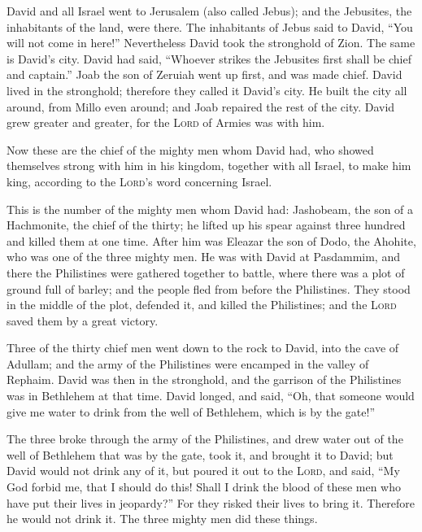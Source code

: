  David and all Israel went to Jerusalem (also called
Jebus); and the Jebusites, the inhabitants of the land, were there.
 The inhabitants of Jebus said to David, ``You will not
come in here!'' Nevertheless David took the stronghold of Zion. The same
is David's city.  David had said, ``Whoever strikes the
Jebusites first shall be chief and captain.'' Joab the son of Zeruiah
went up first, and was made chief.  David lived in the
stronghold; therefore they called it David's city.  He
built the city all around, from Millo even around; and Joab repaired the
rest of the city.  David grew greater and greater, for the
\textsc{Lord} of Armies was with him.

 Now these are the chief of the mighty men whom David
had, who showed themselves strong with him in his kingdom, together with
all Israel, to make him king, according to the \textsc{Lord}'s word
concerning Israel.

 This is the number of the mighty men whom David had:
Jashobeam, the son of a Hachmonite, the chief of the thirty; he lifted
up his spear against three hundred and killed them at one time.
 After him was Eleazar the son of Dodo, the Ahohite, who
was one of the three mighty men.  He was with David at
Pasdammim, and there the Philistines were gathered together to battle,
where there was a plot of ground full of barley; and the people fled
from before the Philistines.  They stood in the middle of
the plot, defended it, and killed the Philistines; and the \textsc{Lord}
saved them by a great victory.

 Three of the thirty chief men went down to the rock to
David, into the cave of Adullam; and the army of the Philistines were
encamped in the valley of Rephaim.  David was then in the
stronghold, and the garrison of the Philistines was in Bethlehem at that
time.  David longed, and said, ``Oh, that someone would
give me water to drink from the well of Bethlehem, which is by the
gate!''

 The three broke through the army of the Philistines, and
drew water out of the well of Bethlehem that was by the gate, took it,
and brought it to David; but David would not drink any of it, but poured
it out to the \textsc{Lord},  and said, ``My God forbid
me, that I should do this! Shall I drink the blood of these men who have
put their lives in jeopardy?'' For they risked their lives to bring it.
Therefore he would not drink it. The three mighty men did these things.

